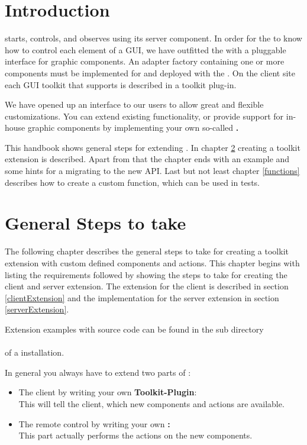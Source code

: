 \chapter{Introduction}
\label{introduction}

\app{} starts, controls, and observes \gdauts using its server component. In
order for the \gdagent to know how to control each element of a GUI, we have
outfitted the \gdagent with a pluggable interface for graphic components. An
adapter factory containing one or more components must be implemented for and
deployed with the \gdaut. On the client site each GUI toolkit that \app{}
supports is described in a toolkit plug-in.

We have opened up an interface to our users to allow great and flexible
customizations. You can extend existing functionality, or provide support for
in-house graphic components by implementing your own so-called
\textbf{\gdtesterclasses.}

This handbook shows general steps for extending \app{}. In chapter
\ref{generalSteps} creating a toolkit extension is described. Apart from that
the chapter ends with an example and some hints for a migrating to the new API.
Last but not least chapter \ref{functions} describes how to create a custom
function, which can be used in \app{} tests.

\chapter{General Steps to take}
\label{generalSteps}

The following chapter describes the general steps to take for creating a toolkit
extension \app{} with custom defined components and actions. This chapter begins
with listing the requirements followed by showing the steps to take for
creating the \app{} client and server extension. The extension for the \app{}
client is described in section \ref{clientExtension} and the implementation
for the \app{} server extension in section \ref{serverExtension}.

Extension examples with source code can
be found in the sub directory\\
\\
of a \app{} installation.

In general you always have to extend two parts of \app{}:
\begin{itemize}
\item The \app{} client by writing your own \textbf{Toolkit-Plugin}:\\
      This will tell the client, which new components and actions are available.
\item The \app{} remote control by writing your own \textbf{\gdtesterclasses:}\\
      This part actually performs the actions on the new components.
\end{itemize}

